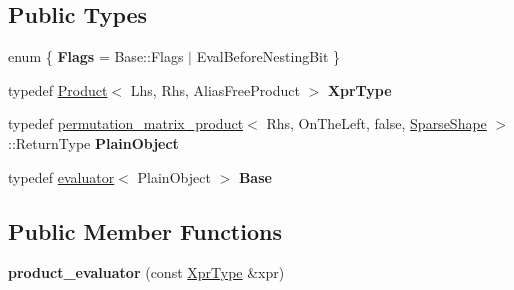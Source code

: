 \subsection*{Public Types}
\begin{DoxyCompactItemize}
\item 
\mbox{\label{struct_eigen_1_1internal_1_1product__evaluator_3_01_product_3_01_lhs_00_01_rhs_00_01_alias_free_0706ef7a5a2e7de13f2e1755913a650d_ac37787c37a78edc67d0ea909a243aa63}} 
enum \{ {\bfseries Flags} = Base\+::Flags $\vert$ Eval\+Before\+Nesting\+Bit
 \}
\item 
\mbox{\label{struct_eigen_1_1internal_1_1product__evaluator_3_01_product_3_01_lhs_00_01_rhs_00_01_alias_free_0706ef7a5a2e7de13f2e1755913a650d_ab670c8faa1e589d707171da93712daf9}} 
typedef \mbox{\hyperlink{class_eigen_1_1_product}{Product}}$<$ Lhs, Rhs, Alias\+Free\+Product $>$ {\bfseries Xpr\+Type}
\item 
\mbox{\label{struct_eigen_1_1internal_1_1product__evaluator_3_01_product_3_01_lhs_00_01_rhs_00_01_alias_free_0706ef7a5a2e7de13f2e1755913a650d_a00f9b05e0130953158ac9c3967d1f0f8}} 
typedef \mbox{\hyperlink{struct_eigen_1_1internal_1_1permutation__matrix__product}{permutation\+\_\+matrix\+\_\+product}}$<$ Rhs, On\+The\+Left, false, \mbox{\hyperlink{struct_eigen_1_1_sparse_shape}{Sparse\+Shape}} $>$\+::Return\+Type {\bfseries Plain\+Object}
\item 
\mbox{\label{struct_eigen_1_1internal_1_1product__evaluator_3_01_product_3_01_lhs_00_01_rhs_00_01_alias_free_0706ef7a5a2e7de13f2e1755913a650d_a74e15ec5cf5cc9094ee8a92bf2ef788e}} 
typedef \mbox{\hyperlink{struct_eigen_1_1internal_1_1evaluator}{evaluator}}$<$ Plain\+Object $>$ {\bfseries Base}
\end{DoxyCompactItemize}
\subsection*{Public Member Functions}
\begin{DoxyCompactItemize}
\item 
\mbox{\label{struct_eigen_1_1internal_1_1product__evaluator_3_01_product_3_01_lhs_00_01_rhs_00_01_alias_free_0706ef7a5a2e7de13f2e1755913a650d_ace387db98a399739c14f1a3fc957aaff}} 
{\bfseries product\+\_\+evaluator} (const \mbox{\hyperlink{class_eigen_1_1_product}{Xpr\+Type}} \&xpr)
\end{DoxyCompactItemize}
